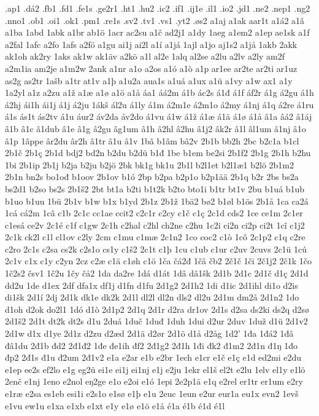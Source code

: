 .ap1
.dá2
.fb1
.fd1
.fe1s
.ge2r1
.ht1
.hu2
.ic2
.if1
.ij1e
.il1
.io2
.jd1
.ne2
.nep1
.ng2
.nno1
.ob1
.oi1
.ok1
.pm1
.re1s
.sv2
.tv1
.vs1
.yt2
.øs2
a1aj
a1ak
aar1t
a1á2
a1â
a1ba
1abd
1abk
a1br
ab1ö
1acr
ac2su
a1č
ad2j1
a1dy
1aeg
a1em2
a1ep
ae1sk
a1f
a2fal
1afc
a2fo
1afs
a2fö
a1gu
ai1j
ai2l
a1í
a1já
1ajl
a1jo
aj1s2
a1jå
1akb
2akk
ak1oh
ak2ry
1aks
ak1w
ak1äv
a2kö
a1l
al2e
1alq
al2se
a2lu
a2lv
a2ly
am2f
a2m1ia
am2je
a1m2w
2ank
a1nr
a1o
a2os
a1ó
a1ò
a1p
ar1ee
ar2te
ar2ti
ar1uz
as2g
as2tr
1ašb
a1tr
at1v
a1þ
a1u2a
aua1s
a1uá
a1ux
a1ü
a1vy
a1w
ax1
a1y
1a2yl
a1z
a2zu
a1ž
a1æ
a1ø
a1ö
a1å
áa1
áá2m
á1b
ác2s
á1đ
á1f
áf2r
á1g
á2gu
á1h
á2hj
ái1h
ái1j
á1j
á2ju
1ákš
ál2u
á1ly
á1m
á2m1e
á2m1o
á2my
á1nj
á1q
á2re
á1ru
á1s
ás1t
ás2tv
á1u
áur2
áv2da
áv2do
á1vu
á1w
á1ž
á1æ
á1ä
á1ø
á1å
â1a
âá2
â1áj
â1b
â1c
â1dub
â1e
â1g
â2gu
âg1um
â1h
â2hl
â2hu
â1j2
âk2r
â1l
âl1um
â1nj
â1o
â1p
1âppe
âr2du
âr2h
â1tr
â1u
â1v
1bâ
b1âm
bâ2v
2b1b
bb2h
2bc
b2c1a
b1cl
2b1č
2b1ç
2b1d
bdj2
bd2n
b2du
b2dü
b1đ
1be
b1em
be2si
2b1f2
2b1g
2b1h
b2hu
1bi
2b1ip
2b1j
b2ja
b2ju
b2jö
2bk
bk1g
bk1u
2b1l
b2l1et
b2l1æ1
b2lö
2b1m2
2b1n
bn2s
bo1ođ
b1oov
2b1ov
b1ó
2bp
b2pa
b2p1o
b2p1ää
2b1q
b2r
2bs
bs2a
bs2d1
b2so
bs2s
2b1š2
2bt
bt1a
b2ti
b1t2k
b2to
bto1i
b1tr
bt1v
2bu
b1uá
b1ub
b1uo
b1uu
1bü
2b1v
b1w
b1x
b1yd
2b1z
2b1ž
1bä2
bø2
b1øl
b1ös
2b1å
1ca
ca2á
1cá
cá2m
1câ
c1b
2c1c
cc1ae
ccit2
c2c1r
c2cy
c1č
c1ç
2c1d
cds2
1ce
ce1m
2c1er
c1esá
ce2v
2c1é
c1f
c1gw
2c1h
c2hal
c2hl
ch2ne
c2hu
1c2i
ci2n
ci2p
ci2t
1cî
c1j2
2c1k
ck2l
c1l
cl1ov
c2ly
2cm
c1mu
c1mæ
2c1n2
1co
coc2
c1ò
1cô
2c1p2
c1q
c2re
c2ro
2c1s
c2sa
cs2k
c2s1o
cs1y
c1š2
2c1t
c1þ
1cu
c1ub
c1ur
c2uv
2cuvs
2c1ü
1cú
2c1v
c1x
c1y
c2yn
2cz
c2æ
c1ä
c1øh
c1ö
1ča
čá2đ
1čâ
čb2
2č1č
1či
2č1j2
2č1k
1čo
1č2s2
čsv1
1č2u
1čy
čå2
1da
da2re
1dá
d1át
1dâ
dâ1šk
2d1b
2d1c
2d1č
d1ç
2d1d
dd2u
1de
d1ex
2df
dfa1x
df1j
d1fn
d1fu
2d1g2
2d1h2
1di
d1ic
2d1ihl
di1o
d2is
di1šk
2d1í
2dj
2d1k
dk1e
dk2k
2d1l
dl2l
dl2n
dls2
dl2u
2d1m
dm2å
2d1n2
1do
d1oh
d2ok
do2l1
1dó
d1ò
2d1p2
2d1q
2d1r
d2ra
dr1ov
2d1s
d2sa
ds2ki
ds2q
d2sø
2d1š2
2d1t
dt2k
dt2s
d1u
2duá
1duč
1duđ
1duh
1dui
d2ur
2duv
1duž
d1ü
2d1v2
2d1w
d1x
d1ye
2d1z
d2zu
d2æd
2d1ä
d2ør
2d1ö
d1å
d2åg
1d2'
1đa
1đá2
1đâ
đâ1du
2đ1b
đd2
2đ1đ2
1đe
đe1ih
đf2
2đ1g2
2đ1h
1đi
đk2
đ1m2
2đ1n
đ1ŋ
1đo
đp2
2đ1s
đ1u
đ2um
2đ1v2
e1a
e2ar
e1b
e2br
1ech
e1cr
e1č
e1ç
e1d
ed2mi
e2du
e1ep
ee2s
ef2lo
e1g
eg2ü
ei1e
ei1j
ei1nj
e1j
e2ju
1ekr
el1š
el2t
e2lu
1elv
el1y
e1lö
2enč
e1nj
1eno
e2nol
eŋ2ge
e1o
e2oi
e1ó
1epi
2e2p1ä
e1q
e2rel
er1tr
er1um
e2ry
e1ræ
e2sa
es1eb
esi1i
e2s1o
e1sø
e1þ
e1u
2euc
1eun
e2ur
eur1a
eu1x
evn2
1evš
e1vu
ew1u
e1xa
e1xb
e1xt
e1y
e1ø
e1ö
e1å
é1a
é1b
é1d
é1l
